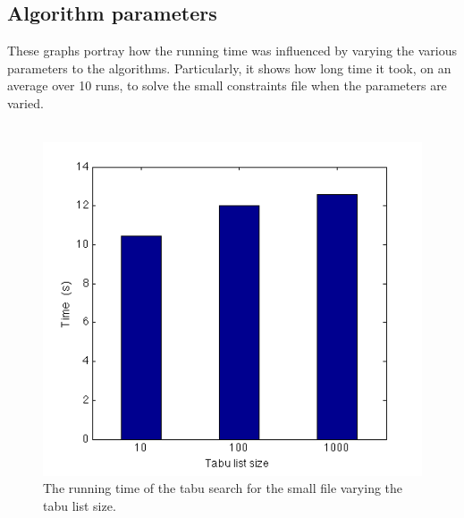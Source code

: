 \documentclass[titlepage,a4paper]{article}
\begin{document}
\subsection{Algorithm parameters}
These graphs portray how the running time was influenced by varying the various parameters to the algorithms. Particularly, it shows how long time it took, on an average over 10 runs, to solve the small constraints file when the parameters are varied. \\\\
\begin{figure}[H]
  \begin{center}
    \includegraphics[scale=0.5]{../results/tabu_list_size.png}
  \end{center}
  \caption{The running time of the tabu search for the small file varying the tabu list size.}
  \label{tabu_list_size}
\end{figure}
\end{document}
